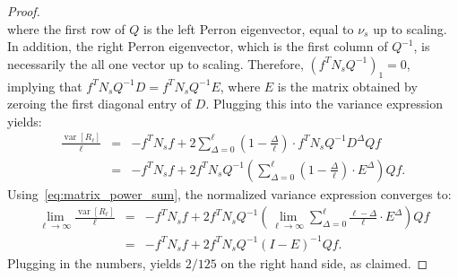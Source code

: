 \documentclass{article}
\DeclareMathOperator{\var}{var}
\begin{document}
\begin{proof}
\begin{equation*}
    \end{equation*}
    where the first row of $Q$ is the left Perron eigenvector, equal to $\nu_s$ up to scaling.
    In addition, the right Perron eigenvector, which is the first column of $Q^{-1}$, is necessarily the all one vector up to scaling.
    Therefore, $(f^T N_s Q^{-1})_1 = 0$, implying that $f^T N_s Q^{-1} D = f^T N_s Q^{-1} E$, where $E$ is the matrix obtained by zeroing the first diagonal entry of $D$.
    Plugging this into the variance expression yields:
    \begin{eqnarray*}
        \frac{\var[R_\ell]}{\ell} 
        &=& - f^T N_s f + 2 \sum_{\Delta=0}^{\ell} (1-\frac{\Delta}{\ell}) \cdot f^T N_s Q^{-1} D^\Delta Q f \\
        &=& - f^T N_s f + 2 f^T N_s Q^{-1} \left( \sum_{\Delta=0}^\ell (1-\frac{\Delta}{\ell}) \cdot E^\Delta \right) Q f.
    \end{eqnarray*}
    Using~\eqref{eq:matrix_power_sum}, the normalized variance expression converges to:
    \begin{eqnarray*}
        \lim_{\ell\to\infty} \frac{\var[R_\ell]}{\ell} 
        &=& -f^T N_s f + 2 f^T N_s Q^{-1} \left( \lim_{\ell\to\infty} \sum_{\Delta=0}^\ell \frac{\ell-\Delta}{\ell} \cdot E^\Delta \right) Q f \\
        &=& -f^T N_s f + 2 f^T N_s Q^{-1} (I-E)^{-1} Q f.
    \end{eqnarray*}
    Plugging in the numbers, yields $2/125$ on the right hand side, as claimed.
\end{proof}
    
\end{document}

